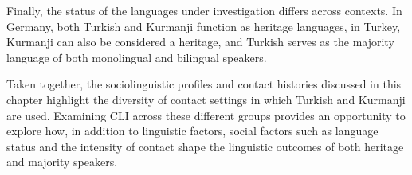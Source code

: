 Finally, the status of the languages under investigation differs across contexts. In Germany, both Turkish and Kurmanji function as heritage languages, in Turkey, Kurmanji can also be considered a heritage, and Turkish serves as the majority language of both monolingual and bilingual speakers. 

Taken together, the sociolinguistic profiles and contact histories discussed in this chapter highlight the diversity of contact settings in which Turkish and Kurmanji are used. Examining CLI across these different groups provides an opportunity to explore how, in addition to linguistic factors, social factors such as language status and the intensity of contact shape the linguistic outcomes of both heritage and majority speakers.

